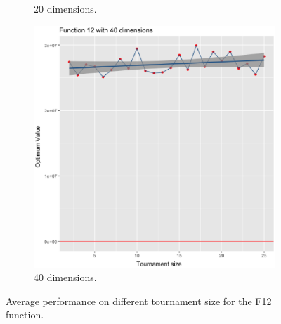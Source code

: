 \begin{figure}[t]
\begin{subfigure}[b]{0.33\textwidth}
		\caption{20 dimensions.}
	\end{subfigure}
	\begin{subfigure}[b]{0.33\textwidth}
		\centering
		\includegraphics[width=\textwidth]{img/12dim_40.ps}
		\caption{40 dimensions.}
	\end{subfigure}
	\caption{Average performance on different tournament size for the F12 function.}
	\label{12}
\end{figure}


